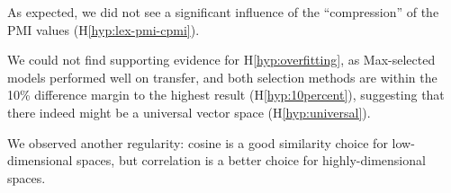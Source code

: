 As expected, we did not see a significant influence of the ``compression'' of the PMI values (H\ref{hyp:lex-pmi-cpmi}).

We could not find supporting evidence for H\ref{hyp:overfitting}, as Max-selected models performed well on transfer, and both selection methods are within the 10\% difference margin to the highest result (H\ref{hyp:10percent}), suggesting that there indeed might be a universal vector space (H\ref{hyp:universal}).

We observed another regularity: cosine is a good similarity choice for low-dimensional spaces, but correlation is a better choice for highly-dimensional spaces.

